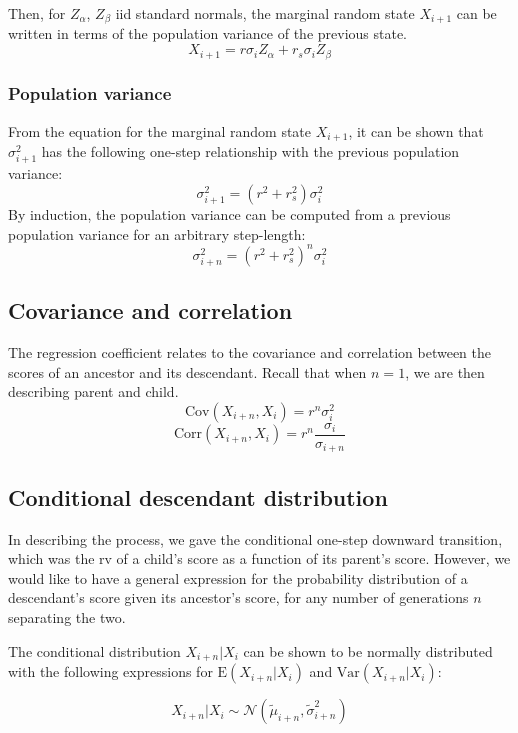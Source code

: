 \documentclass[a4paper,11pt]{article} %
\begin{document}
Then, for $Z_\alpha$, $Z_\beta$ iid standard normals, the marginal random state $X_{i+1}$ can be written in terms of the population variance of the previous state.
$$X_{i+1} = r\sigma_iZ_\alpha + r_s\sigma_iZ_\beta$$

\subsubsection*{Population variance}
From the equation for the marginal random state $X_{i+1}$, it can be shown that $\sigma_{i+1}^2$ has the following one-step relationship with the previous population variance:
$$\sigma_{i+1}^2 = (r^2+r_s^2)  \sigma_i^2$$
By induction, the population variance can be computed from a previous population variance for an arbitrary step-length:
$$\sigma_{i+n}^2 = (r^2+r_s^2)^n  \sigma_{i}^2$$



\subsection{Covariance and correlation}
The regression coefficient relates to the covariance and correlation between the scores of an ancestor and its descendant. Recall that when $n = 1$, we are then describing parent and child. 
$$\mathrm{Cov}(X_{i+n}, X_i) = r^n \sigma_i^2$$
$$\mathrm{Corr}(X_{i+n}, X_i) = r^n \frac{\sigma_i}{\sigma_{i+n}}$$






\subsection{Conditional descendant distribution}

In describing the process, we gave the conditional one-step downward transition, which was the rv of a child's score as a function of its parent's score. However, we would like to have a general expression for the probability distribution of a descendant's score given its ancestor's score, for any number of generations $n$ separating the two. 

The conditional distribution $X_{i+n}|X_i$ can be shown to be normally distributed with the following expressions for $\mathrm{E}(X_{i+n}|X_i)$ and $\mathrm{Var}(X_{i+n}|X_i)$:

$$X_{i+n}|X_i \sim \mathcal{N}( \tilde{\mu}_{i+n}, \tilde{\sigma}_{i+n}^2)$$
\end{document}
